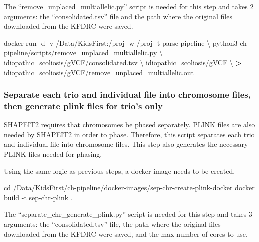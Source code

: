 \documentclass[]{article}
\newenvironment{Shaded}{\begin{snugshade}}{\end{snugshade}}
\newcommand{\BuiltInTok}[1]{#1}
\newcommand{\ExtensionTok}[1]{#1}
\newcommand{\NormalTok}[1]{#1}
\newcommand{\OperatorTok}[1]{\textcolor[rgb]{0.81,0.36,0.00}{\textbf{#1}}}
\begin{document}
The ``remove\_unplaced\_multiallelic.py'' script is needed for this step
and takes 2 arguments: the ``consolidated.tsv'' file and the path where
the original files downloaded from the KFDRC were saved.

\begin{Shaded}
\begin{Highlighting}[]
\ExtensionTok{docker}\NormalTok{ run -d -v /Data/KidsFirst:/proj -w /proj -t parse-pipeline \textbackslash{}}
\NormalTok{  python3 ch-pipeline/scripts/remove_unplaced_multiallelic.py \textbackslash{}}
\NormalTok{  idiopathic_scoliosis/gVCF/consolidated.tsv \textbackslash{}}
\NormalTok{  idiopathic_scoliosis/gVCF \textbackslash{}}
  \OperatorTok{>}\NormalTok{ idiopathic_scoliosis/gVCF/remove_unplaced_multiallelic.out}
\end{Highlighting}
\end{Shaded}

\hypertarget{separate-each-trio-and-individual-file-into-chromosome-files-then-generate-plink-files-for-trios-only}{%
\subsubsection{Separate each trio and individual file into chromosome
files, then generate plink files for trio's
only}\label{separate-each-trio-and-individual-file-into-chromosome-files-then-generate-plink-files-for-trios-only}}

SHAPEIT2 requires that chromosomes be phased separately. PLINK files are
also needed by SHAPEIT2 in order to phase. Therefore, this script
separates each trio and individual file into chromosome files. This step
also generates the necessary PLINK files needed for phasing.

Using the same logic as previous steps, a docker image needs to be
created.

\begin{Shaded}
\begin{Highlighting}[]
\BuiltInTok{cd}\NormalTok{ /Data/KidsFirst/ch-pipeline/docker-images/sep-chr-create-plink-docker}
\ExtensionTok{docker}\NormalTok{ build -t sep-chr-plink .}
\end{Highlighting}
\end{Shaded}

The ``separate\_chr\_generate\_plink.py'' script is needed for this step
and takes 3 arguments: the ``consolidated.tsv'' file, the path where the
original files downloaded from the KFDRC were saved, and the max number
of cores to use.
\end{document}
